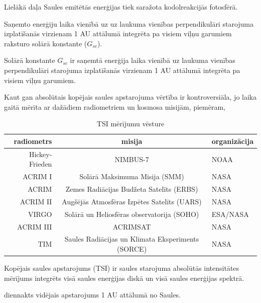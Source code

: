 
Lielākā daļa Saules emitētās enerģijas tiek saražota kodolreakcijās fotosfērā.

Saņemto enerģiju laika vienībā uz uz laukuma vienības perpendikulāri starojuma izplatīšanās virzienam 1 AU attālumā integrēta pa visiem viļņu garumiem raksturo solārā konstante ($G_{sc}$).



Solārā konstante $G_{sc}$ ir saņemtā enerģija laika vienībā uz laukuma vienības perpendikulāri starojuma izplatīšanās virzienam 1 AU attālumā integrēta pa visiem viļņu garumiem.\cite{ThermalProcesses}


Kaut gan absolūtais kopējais saules apstarojuma vērtība ir kontroversiāla, jo laika gaitā mērīta ar dažādiem radiometriem un kosmosa misijām, piemēram, 

\begin{table}[h]
    \caption{TSI mērījumu vēsture} %
    \begin{center}
    \begin{tabular}{| r | c | l |}
    \hline
    radiometrs & misija & organizācija \\     \hline
    Hickey-Frieden & NIMBUS-7 & NOAA  \\     \hline
	ACRIM I & Solārā Maksimuma Misija (SMM) & NASA \\ 	\hline
	ACRIM  & Zemes Radiācijas Budžeta Satelīts (ERBS) & NASA \\ 	\hline
	ACRIM II & Augšējās Atmosfēras Izpētes Satelīts (UARS) & NASA \\ 	\hline
	VIRGO & Solārā un Heliosfēras observatorija (SOHO)& ESA/NASA \\ 	\hline
	ACRIM III & ACRIMSAT  & NASA \\ 	\hline
	TIM & Saules Radiācijas un Klimata Eksperiments (SORCE) & NASA \\
    \hline
    \end{tabular}
    \end{center}
    \label{tab:radiometers}
\end{table}




Kopējais saules apstarojums (TSI) ir saules starojuma absolūtās intensitātes mērījums integrēts visā saules enerģijas diskā un visā saules enerģijas spektrā.

diennakts vidējais apstarojums 1 AU attālumā no Saules.


